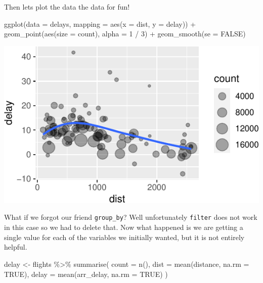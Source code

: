 \documentclass[]{tufte-handout}
\newenvironment{Shaded}{}{}
\newcommand{\AttributeTok}[1]{\textcolor[rgb]{0.49,0.56,0.16}{#1}}
\newcommand{\ConstantTok}[1]{\textcolor[rgb]{0.53,0.00,0.00}{#1}}
\newcommand{\DecValTok}[1]{\textcolor[rgb]{0.25,0.63,0.44}{#1}}
\newcommand{\FunctionTok}[1]{\textcolor[rgb]{0.02,0.16,0.49}{#1}}
\newcommand{\NormalTok}[1]{#1}
\newcommand{\OtherTok}[1]{\textcolor[rgb]{0.00,0.44,0.13}{#1}}
\newcommand{\SpecialCharTok}[1]{\textcolor[rgb]{0.25,0.44,0.63}{#1}}
\begin{document}
Then lets plot the data the data for fun!

\begin{Shaded}
\begin{Highlighting}[]
\FunctionTok{ggplot}\NormalTok{(}\AttributeTok{data =}\NormalTok{ delays, }\AttributeTok{mapping =} \FunctionTok{aes}\NormalTok{(}\AttributeTok{x =}\NormalTok{ dist, }\AttributeTok{y =}\NormalTok{ delay)) }\SpecialCharTok{+}
  \FunctionTok{geom\_point}\NormalTok{(}\FunctionTok{aes}\NormalTok{(}\AttributeTok{size =}\NormalTok{ count), }\AttributeTok{alpha =} \DecValTok{1} \SpecialCharTok{/} \DecValTok{3}\NormalTok{) }\SpecialCharTok{+}
  \FunctionTok{geom\_smooth}\NormalTok{(}\AttributeTok{se =} \ConstantTok{FALSE}\NormalTok{)}
\end{Highlighting}
\end{Shaded}

\begin{center}\includegraphics{R-Guide_files/figure-latex/unnamed-chunk-9-1} \end{center}

What if we forgot our friend \texttt{group\_by}? Well unfortunately
\texttt{filter} does not work in this case so we had to delete that. Now
what happened is we are getting a single value for each of the variables
we initially wanted, but it is not entirely helpful.

\begin{Shaded}
\begin{Highlighting}[]
\NormalTok{delay }\OtherTok{\textless{}{-}}\NormalTok{ flights }\SpecialCharTok{\%\textgreater{}\%}
  \FunctionTok{summarise}\NormalTok{(}
    \AttributeTok{count =} \FunctionTok{n}\NormalTok{(),}
    \AttributeTok{dist =} \FunctionTok{mean}\NormalTok{(distance, }\AttributeTok{na.rm =} \ConstantTok{TRUE}\NormalTok{),}
    \AttributeTok{delay =} \FunctionTok{mean}\NormalTok{(arr\_delay, }\AttributeTok{na.rm =} \ConstantTok{TRUE}\NormalTok{)}
\NormalTok{  )}
\end{Highlighting}
\end{Shaded}
\end{document}
